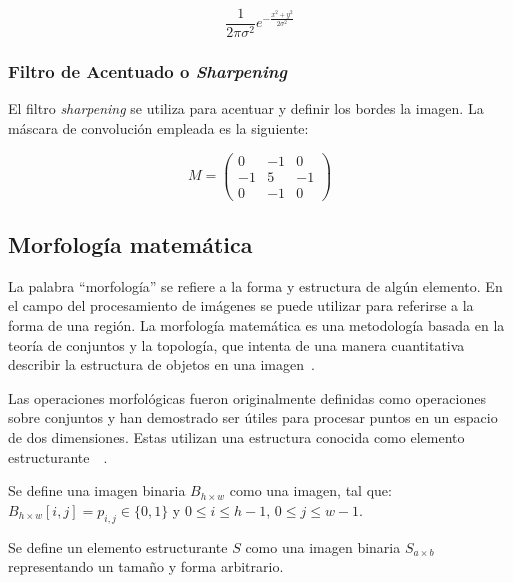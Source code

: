 \begin{equation}
	\frac{1}{2\pi\sigma^2} e^{-\frac{x^2 + y^2}{2\sigma^2}}
\end{equation}

\subsubsection{Filtro de Acentuado o \textit{Sharpening}}

El filtro \textit{sharpening} se utiliza para acentuar y definir los bordes la imagen. La máscara de convolución empleada es la siguiente:

\begin{equation}
	M = \begin{pmatrix} 
		0 & -1 & 0 \\
		-1 & 5 & -1 \\ 
		0 & -1 & 0
	\end{pmatrix}
\end{equation}

\subsection{Morfología matemática}

La palabra ``morfología'' se refiere a la forma y estructura de algún elemento. En el campo del procesamiento de imágenes se puede utilizar para referirse a la forma de una región. La morfología matemática es una metodología basada en la teoría de conjuntos y la topología, que intenta de una manera cuantitativa describir la estructura de objetos en una imagen~\cite{bovik2009essential}.

Las operaciones morfológicas fueron originalmente definidas como operaciones sobre conjuntos y han demostrado ser útiles para procesar puntos en un espacio de dos dimensiones. Estas utilizan una estructura conocida como elemento estructurante~\cite{soille1999morphological}~\cite{haralick1987image}.

\begin{definition}
	Se define una imagen binaria $B_{h \times w}$ como una imagen, tal que: $B_{h \times w}[i, j] = p_{i, j} \in \{0, 1\}$ y $0 \leq i \leq h - 1$, $ 0 \leq j \leq w-1$.
\end{definition}

\begin{definition}
	Se define un elemento estructurante $S$ como una imagen binaria $S_{a \times b}$ representando un tamaño y forma arbitrario.
\end{definition}

